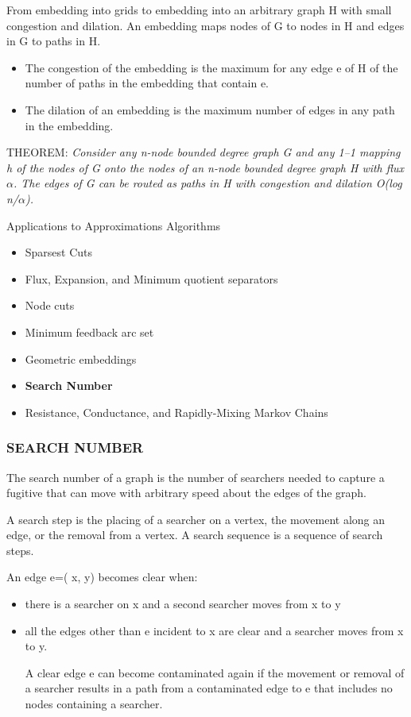 \begin{frame}
From embedding into grids to embedding into an arbitrary graph H with small congestion and dilation. 
An embedding maps nodes of
G to nodes in H and edges in G to paths in H. 
\begin{itemize}
\item The congestion of the embedding
is the maximum for any edge e of H of the number of paths in the embedding
that contain e.
\item The dilation of an embedding is the maximum number of edges in
any path in the embedding.
\end{itemize}

THEOREM:
\textit{Consider any n-node bounded degree graph G and any 1–1
mapping h of the nodes of G onto the nodes of an n-node bounded degree graph H
with flux $\alpha$. The edges of G can be routed as paths in H with congestion and dilation
O(log n/$\alpha$).}

\end{frame}


\begin{frame}[t]
\begin{block}{Applications to Approximations Algorithms}
	\begin{itemize}
			\item Sparsest Cuts
            \item Flux, Expansion, and Minimum quotient separators
            \item Node cuts
			\item Minimum feedback arc set
            \item Geometric embeddings
        	\item \textbf{Search Number}
            \item Resistance, Conductance, and Rapidly-Mixing Markov Chains
	 \end{itemize} 
\end{block}
\end{frame}

\begin{frame}
\frametitle{ SEARCH NUMBER}
The search number of a graph is the number of searchers needed to capture a fugitive that can move with arbitrary speed about the edges of the graph.

A search step is the placing of
a searcher on a vertex, the movement along an edge, or the removal from a vertex. A search sequence is a sequence of search steps.

An edge e=( x, y) becomes clear when:
\begin{itemize}
\item there is a searcher on x and a second searcher moves from x to y
\item all the edges
other than e incident to x are clear and a searcher moves from x to y. 

A clear edge e can become contaminated again if the movement or removal of a searcher
results in a path from a contaminated edge to e that includes no nodes containing
a searcher.

\end{itemize}
\end{frame}

